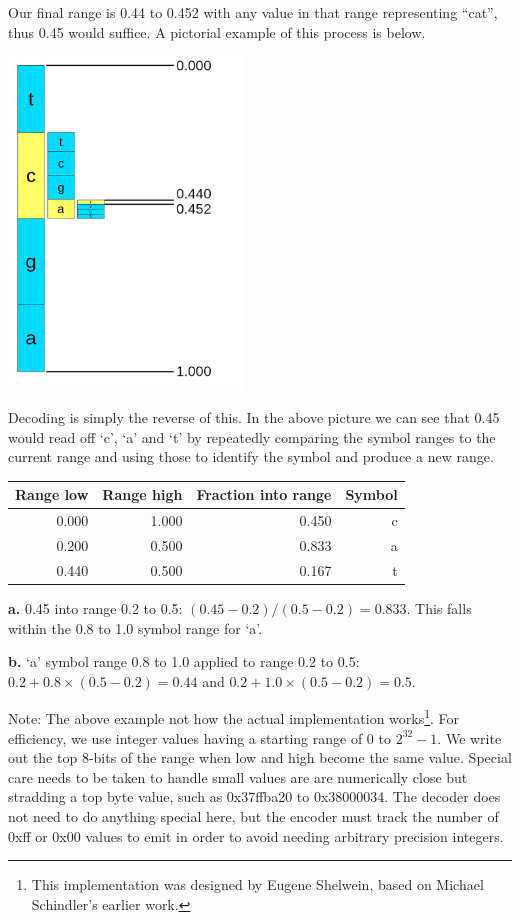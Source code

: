 \documentclass[a4paper]{article}
\begin{document}
Our final range is 0.44 to 0.452 with any value in that range representing
``cat'', thus 0.45 would suffice.  A pictorial example of this process is below.

\includegraphics[height=250pt, keepaspectratio=true]{img/range_code.png}

Decoding is simply the reverse of this.  In the above picture we can see that 0.45 would read off `c', `a' and `t' by repeatedly comparing the symbol ranges to the current range and using those to identify the symbol and produce a new range.

\begin{threeparttable}[t]
\begin{tabular}{rrrr}
\hline
\textbf{Range low} & \textbf{Range high} & \textbf{Fraction into range} & \textbf{Symbol}\\
\hline
0.000 & 1.000 & 0.450 & c\\
0.200 & 0.500 & 0.833\tnote{\textbf{a}} & a\\
0.440\tnote{\textbf{b}} & 0.500 & 0.167 & t\\
\hline
\end{tabular}
\begin{tablenotes}
\item{\textbf{a.}} 0.45 into range 0.2 to 0.5: $(0.45-0.2)/(0.5-0.2) = 0.833$.
This falls within the 0.8 to 1.0 symbol range for `a'.
\item{\textbf{b.}} `a' symbol range 0.8 to 1.0 applied to range 0.2 to 0.5:  $0.2+0.8\times(0.5-0.2) = 0.44$ and $0.2+1.0\times(0.5-0.2) = 0.5$.
\end{tablenotes}
\end{threeparttable}

Note: The above example not how the actual implementation works\footnote{This implementation was designed by Eugene Shelwein, based on Michael Schindler's earlier work.}.
For efficiency, we use integer values having a starting range of 0 to $2^{32}-1$.
We write out the top 8-bits of the range when low and high become the same value.
Special care needs to be taken to handle small values are are numerically close but stradding a top byte value, such as 0x37ffba20 to 0x38000034.
The decoder does not need to do anything special here, but the encoder must track the number of 0xff or 0x00 values to emit in order to avoid needing arbitrary precision integers.
\end{document}
